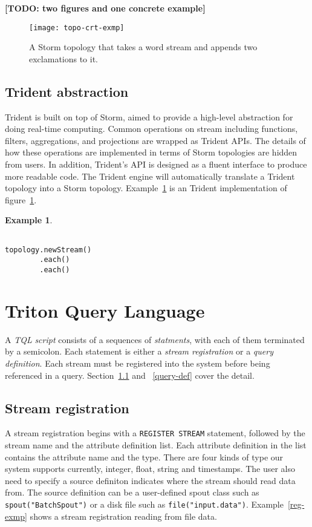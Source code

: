\documentclass[conference, twocolumn, twoside, 11pt]{IEEEtran}
\theoremstyle{definition}
\newtheorem{example}{Example}[section]
\begin{document}
\textbf{[TODO: two figures and one concrete example]}

\begin{figure}[hbt]
\centering
\texttt{[image: topo-crt-exmp]}
\caption{A Storm topology that takes a word stream and appends two exclamations to it.}
\label{topo-crt-exmp}
\end{figure}

\subsection{Trident abstraction}
Trident is built on top of Storm, aimed to provide a high-level abstraction for doing real-time computing. Common operations on stream including functions, filters, aggregations, and projections are wrapped as Trident APIs. The details of how these operations are implemented in terms of Storm topologies are hidden from users. In addition, Trident's API is designed as a fluent interface to produce more readable code. The Trident engine will automatically translate a Trident topology into a Storm topology. Example~\ref{trident-impl-exmp} is an Trident implementation of figure~\ref{topo-crt-exmp}.

\begin{example}\label{trident-impl-exmp}
\begin{verbatim}

topology.newStream()
        .each()
        .each()
\end{verbatim}
\end{example}

\section{Triton Query Language}\label{tql}
A \emph{TQL} \emph{script} consists of a sequences of \emph{statments}, with each of them terminated by a semicolon. Each statement is either a \emph{stream registration} or a \emph{query definition}. Each stream must be registered into the system before being referenced in a query. Section~\ref{stream-reg} and ~\ref{query-def} cover the detail.\

\subsection{Stream registration}\label{stream-reg}
A stream registration begins with a \texttt{REGISTER STREAM} statement, followed by the stream name and the attribute definition list. Each attribute definition in the list contains the attribute name and the type. There are four kinds of type our system supports currently, integer, float, string and timestamps. The user also need to specify a source definiton indicates where the stream should read data from. The source definition can be a user-defined spout class such as \texttt{spout("BatchSpout")} or a disk file such as \texttt{file("input.data")}. Example~\ref{reg-exmp} shows a stream registration reading from file data.
\end{document}
